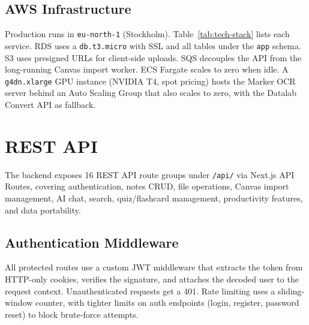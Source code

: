 \documentclass[12pt,a4paper]{article}
\newcommand{\tech}[1]{\texttt{#1}}
\begin{document}
\subsection{AWS Infrastructure}

Production runs in \tech{eu-north-1} (Stockholm). Table~\ref{tab:tech-stack} lists each service. RDS uses a \tech{db.t3.micro} with SSL and all tables under the \tech{app} schema. S3 uses presigned URLs for client-side uploads. SQS decouples the API from the long-running Canvas import worker. ECS Fargate scales to zero when idle. A \tech{g4dn.xlarge} GPU instance (NVIDIA T4, spot pricing) hosts the Marker OCR server behind an Auto Scaling Group that also scales to zero, with the Datalab Convert API as fallback.


\section{REST API}
\label{sec:api}

The backend exposes 16 REST API route groups under \tech{/api/} via Next.js API Routes, covering authentication, notes CRUD, file operations, Canvas import management, AI chat, search, quiz/flashcard management, productivity features, and data portability.

\subsection{Authentication Middleware}
\label{sec:api-auth}

All protected routes use a custom JWT middleware that extracts the token from HTTP-only cookies, verifies the signature, and attaches the decoded user to the request context. Unauthenticated requests get a 401. Rate limiting uses a sliding-window counter, with tighter limits on auth endpoints (login, register, password reset) to block brute-force attempts.
\end{document}
